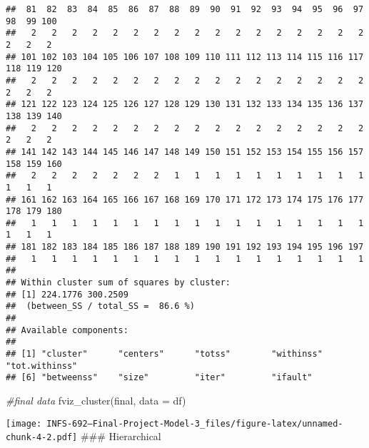 \documentclass[
]{article}
\newenvironment{Shaded}{\begin{snugshade}}{\end{snugshade}}
\newcommand{\AttributeTok}[1]{\textcolor[rgb]{0.77,0.63,0.00}{#1}}
\newcommand{\CommentTok}[1]{\textcolor[rgb]{0.56,0.35,0.01}{\textit{#1}}}
\newcommand{\DecValTok}[1]{\textcolor[rgb]{0.00,0.00,0.81}{#1}}
\newcommand{\FunctionTok}[1]{\textcolor[rgb]{0.00,0.00,0.00}{#1}}
\newcommand{\NormalTok}[1]{#1}
\newcommand{\OtherTok}[1]{\textcolor[rgb]{0.56,0.35,0.01}{#1}}
\newcommand{\SpecialCharTok}[1]{\textcolor[rgb]{0.00,0.00,0.00}{#1}}
\newcommand{\StringTok}[1]{\textcolor[rgb]{0.31,0.60,0.02}{#1}}
\begin{document}
\begin{verbatim}
##  81  82  83  84  85  86  87  88  89  90  91  92  93  94  95  96  97  98  99 100 
##   2   2   2   2   2   2   2   2   2   2   2   2   2   2   2   2   2   2   2   2 
## 101 102 103 104 105 106 107 108 109 110 111 112 113 114 115 116 117 118 119 120 
##   2   2   2   2   2   2   2   2   2   2   2   2   2   2   2   2   2   2   2   2 
## 121 122 123 124 125 126 127 128 129 130 131 132 133 134 135 136 137 138 139 140 
##   2   2   2   2   2   2   2   2   2   2   2   2   2   2   2   2   2   2   2   2 
## 141 142 143 144 145 146 147 148 149 150 151 152 153 154 155 156 157 158 159 160 
##   2   2   2   2   2   2   2   1   1   1   1   1   1   1   1   1   1   1   1   1 
## 161 162 163 164 165 166 167 168 169 170 171 172 173 174 175 176 177 178 179 180 
##   1   1   1   1   1   1   1   1   1   1   1   1   1   1   1   1   1   1   1   1 
## 181 182 183 184 185 186 187 188 189 190 191 192 193 194 195 196 197 
##   1   1   1   1   1   1   1   1   1   1   1   1   1   1   1   1   1 
## 
## Within cluster sum of squares by cluster:
## [1] 224.1776 300.2509
##  (between_SS / total_SS =  86.6 %)
## 
## Available components:
## 
## [1] "cluster"      "centers"      "totss"        "withinss"     "tot.withinss"
## [6] "betweenss"    "size"         "iter"         "ifault"
\end{verbatim}

\begin{Shaded}
\begin{Highlighting}[]
\CommentTok{\#final data}
\FunctionTok{fviz\_cluster}\NormalTok{(final, }\AttributeTok{data =}\NormalTok{ df)}
\end{Highlighting}
\end{Shaded}

\texttt{[image: INFS-692---Final-Project-Model-3\_files/figure-latex/unnamed-chunk-4-2.pdf]}
\#\#\# Hierarchical

\begin{Shaded}
\end{Shaded}
\end{document}
